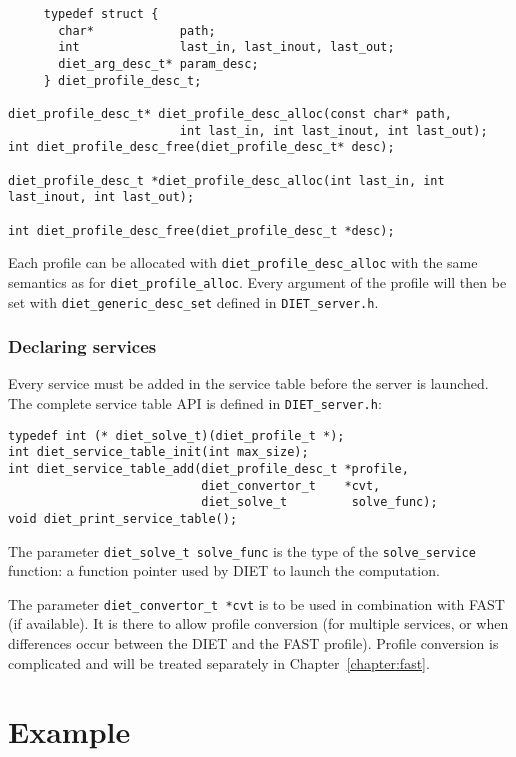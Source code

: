 {{{\begin{verbatim}
     typedef struct {
       char*            path;
       int              last_in, last_inout, last_out;
       diet_arg_desc_t* param_desc;
     } diet_profile_desc_t;

diet_profile_desc_t* diet_profile_desc_alloc(const char* path,
                        int last_in, int last_inout, int last_out);
int diet_profile_desc_free(diet_profile_desc_t* desc);

diet_profile_desc_t *diet_profile_desc_alloc(int last_in, int last_inout, int last_out);

int diet_profile_desc_free(diet_profile_desc_t *desc);
\end{verbatim}
}

Each profile can be allocated with \texttt{diet\_profile\_desc\_alloc} with the
same semantics as for \texttt{diet\_profile\_alloc}. Every argument of the
profile will then be set with \texttt{diet\_generic\_desc\_set} defined in
\texttt{DIET\_server.h}.

\subsubsection*{Declaring services}

Every service must be added in the service table before the server is
launched. The complete service table API is defined in \texttt{DIET\_server.h}:
{\footnotesize
\begin{verbatim}
typedef int (* diet_solve_t)(diet_profile_t *);
int diet_service_table_init(int max_size);
int diet_service_table_add(diet_profile_desc_t *profile,
                           diet_convertor_t    *cvt,
                           diet_solve_t         solve_func);
void diet_print_service_table();
\end{verbatim}
}

The parameter \texttt{diet\_solve\_t solve\_func} is the type of the
\texttt{solve\_service} function: a function pointer used by DIET to launch the
computation.

The parameter \texttt{diet\_convertor\_t *cvt} is to be used in combination
with FAST (if available). It is there to allow profile conversion (for
multiple services, or when differences occur between the DIET and the FAST
profile). Profile conversion is complicated and will be treated
separately in Chapter~\ref{chapter:fast}.

\section{Example}
\label{sec:sv_ex}

}}
